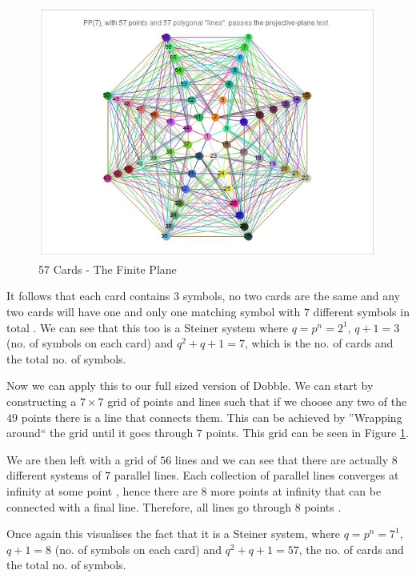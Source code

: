 \documentclass[final]{beamer}
\newlength{\colwidth}
\begin{document}
\begin{frame}[t]
\begin{columns}[t]
\begin{column}{\colwidth}
\begin{block}{}
\begin{multicols}{2}
\begin{figure}
    \includegraphics[width=13cm]{pporder7}
    \caption{57 Cards - The Finite Plane \cite{beresford2011}}
    \label{fig:pporder7}
\end{figure}
    \end{multicols}
  
    It follows that each card contains $3$ symbols, no two cards are the same and any two cards will have one and only one matching symbol with $7$ different symbols in total \cite{westenbrink2022}.
    We can see that this too is a Steiner system where $q = p^n = 2^1$, $q + 1 = 3$ (no. of symbols on each card) and $q^2 + q + 1 = 7$, which is the no. of cards and the total no. of symbols.
    
    Now we can apply this to our full sized version of Dobble. We can start by constructing a $7\times7$ grid of points and lines such that if we choose any two of the $49$ points there is a line that connects them. This can be achieved by ''Wrapping around`` the grid until it goes through $7$ points. This grid can be seen in Figure \ref{fig:pporder7}.

    We are then left with a grid of $56$ lines and we can see that there are actually $8$ different systems of $7$ parallel lines. Each collection of parallel lines converges at infinity at some point \cite{spencer1999}, hence there are $8$ more points at infinity that can be connected with a final line. Therefore, all lines go through $8$ points \cite{Parker2021}.

    Once again this visualises the fact that it is a Steiner system, where $q = p^n = 7^1$, $q + 1 = 8$ (no. of symbols on each card) and $q^2 + q + 1 = 57$, the no. of cards and the total no. of symbols. 


\end{block}
\end{column}
\end{columns}
\end{frame}
\end{document}
